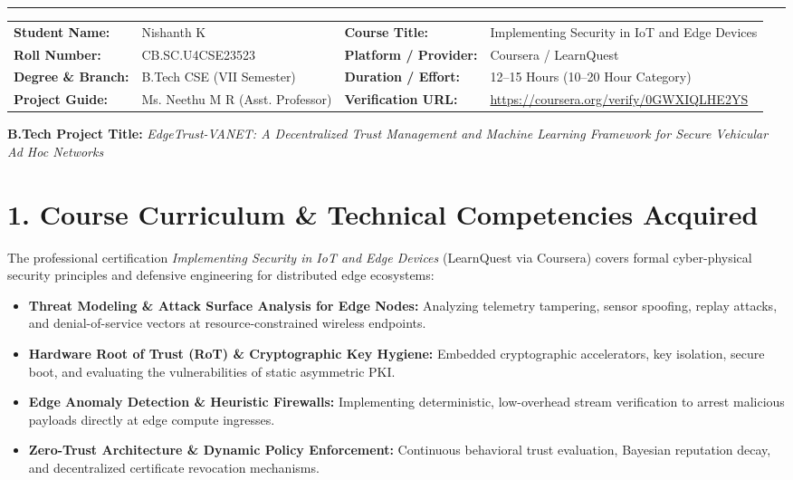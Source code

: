 \documentclass[10pt,a4paper]{article}
\begin{document}
\vspace{-4pt}
\hrule height 0.8pt
\vspace{4pt}

\noindent
\begin{tabularx}{\textwidth}{@{}l X l X@{}}
    \textbf{Student Name:} & Nishanth K & \textbf{Course Title:} & Implementing Security in IoT and Edge Devices \\
    \textbf{Roll Number:} & CB.SC.U4CSE23523 & \textbf{Platform / Provider:} & Coursera / LearnQuest \\
    \textbf{Degree \& Branch:} & B.Tech CSE (VII Semester) & \textbf{Duration / Effort:} & 12--15 Hours (10--20 Hour Category) \\
    \textbf{Project Guide:} & Ms. Neethu M R (Asst. Professor) & \textbf{Verification URL:} & \url{https://coursera.org/verify/0GWXIQLHE2YS} \\
\end{tabularx}

\vspace{3pt}
\noindent
\textbf{B.Tech Project Title:} \textit{EdgeTrust-VANET: A Decentralized Trust Management and Machine Learning Framework for Secure Vehicular Ad Hoc Networks}

\vspace{2pt}
\section*{1. Course Curriculum \& Technical Competencies Acquired}
The professional certification \textit{Implementing Security in IoT and Edge Devices} (LearnQuest via Coursera) covers formal cyber-physical security principles and defensive engineering for distributed edge ecosystems:
\begin{itemize}
    \item \textbf{Threat Modeling \& Attack Surface Analysis for Edge Nodes:} Analyzing telemetry tampering, sensor spoofing, replay attacks, and denial-of-service vectors at resource-constrained wireless endpoints.
    \item \textbf{Hardware Root of Trust (RoT) \& Cryptographic Key Hygiene:} Embedded cryptographic accelerators, key isolation, secure boot, and evaluating the vulnerabilities of static asymmetric PKI.
    \item \textbf{Edge Anomaly Detection \& Heuristic Firewalls:} Implementing deterministic, low-overhead stream verification to arrest malicious payloads directly at edge compute ingresses.
    \item \textbf{Zero-Trust Architecture \& Dynamic Policy Enforcement:} Continuous behavioral trust evaluation, Bayesian reputation decay, and decentralized certificate revocation mechanisms.
\end{itemize}
\end{document}
